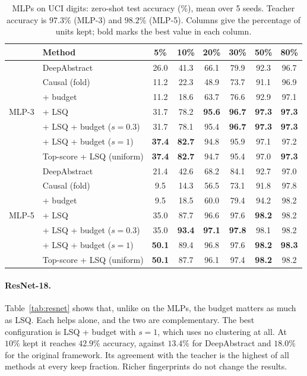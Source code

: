 \documentclass[11pt]{article}
\newcommand{\best}[1]{\textbf{#1}}
\begin{document}
\begin{table}[t]
\centering
\caption{MLPs on UCI digits: zero-shot test accuracy (\%), mean over 5 seeds. Teacher accuracy is
$97.3\%$ (MLP-3) and $98.2\%$ (MLP-5). Columns give the percentage of units kept; bold marks the best
value in each column.}
\label{tab:mlp}
\small
\begin{tabular}{llcccccc}
\toprule
& Method & 5\% & 10\% & 20\% & 30\% & 50\% & 80\% \\
\midrule
\multirow{7}{*}{MLP-3}
& DeepAbstract                 & 26.0 & 41.3 & 66.1 & 79.9 & 92.3 & 96.7 \\
& Causal (fold)                & 11.2 & 22.3 & 48.9 & 73.7 & 91.1 & 96.9 \\
& \quad + budget               & 11.2 & 18.6 & 63.7 & 76.6 & 92.9 & 97.1 \\
& \quad + LSQ                  & 31.7 & 78.2 & \best{95.6} & \best{96.7} & \best{97.3} & \best{97.3} \\
& \quad + LSQ + budget ($s{=}0.3$) & 31.7 & 78.1 & 95.4 & \best{96.7} & \best{97.3} & \best{97.3} \\
& \quad + LSQ + budget ($s{=}1$)   & \best{37.4} & \best{82.7} & 94.8 & 95.9 & 97.1 & 97.2 \\
& Top-score + LSQ (uniform)    & \best{37.4} & \best{82.7} & 94.7 & 95.4 & 97.0 & \best{97.3} \\
\midrule
\multirow{7}{*}{MLP-5}
& DeepAbstract                 & 21.4 & 42.6 & 68.2 & 84.1 & 92.7 & 97.0 \\
& Causal (fold)                &  9.5 & 14.3 & 56.5 & 73.1 & 91.8 & 97.8 \\
& \quad + budget               &  9.5 & 18.5 & 60.0 & 79.4 & 94.2 & 98.2 \\
& \quad + LSQ                  & 35.0 & 87.7 & 96.6 & 97.6 & \best{98.2} & 98.2 \\
& \quad + LSQ + budget ($s{=}0.3$) & 35.0 & \best{93.4} & \best{97.1} & \best{97.8} & 98.1 & 98.2 \\
& \quad + LSQ + budget ($s{=}1$)   & \best{50.1} & 89.4 & 96.8 & 97.6 & \best{98.2} & \best{98.3} \\
& Top-score + LSQ (uniform)    & \best{50.1} & 87.7 & 96.1 & 97.4 & \best{98.2} & 98.2 \\
\bottomrule
\end{tabular}
\end{table}

\paragraph{ResNet-18.} Table~\ref{tab:resnet} shows that, unlike on the MLPs, the budget matters as much
as LSQ. Each helps alone, and the two are complementary. The best configuration is LSQ + budget with
$s=1$, which uses no clustering at all. At $10\%$ kept it reaches $42.9\%$ accuracy, against $13.4\%$ for
DeepAbstract and $18.0\%$ for the original framework. Its agreement with the teacher is the highest of all
methods at every keep fraction. Richer fingerprints do not change the results.
\end{document}
